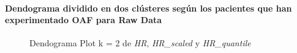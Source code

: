 \paragraph{Dendograma dividido en dos clústeres según los pacientes que han experimentado OAF para Raw Data}

\begin{figure}[H]
    \centering
    \caption{Dendograma Plot k = 2 de \textit{HR}, \textit{HR\_scaled} y \textit{HR\_quantile}}\label{fig:raw_data_ctg_fc}
\end{figure}

